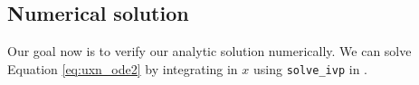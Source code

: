 
\subsection{Numerical solution}
\label{sec:normal_mode_numerical_soln_alpha=0}

Our goal now is to verify our analytic solution numerically. We can solve Equation \eqref{eq:uxn_ode2} by integrating in $x$ using \texttt{solve\_ivp} in \citet{SciPy2020}.

